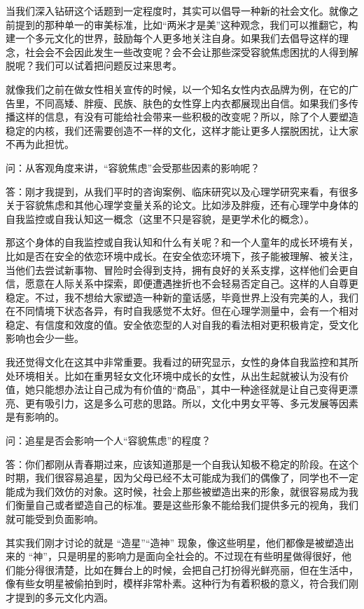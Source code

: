 当我们深入钻研这个话题到一定程度时，其实可以倡导一种新的社会文化。就像之前提到的那种单一的审美标准，比如``两米才是美''这种观念，我们可以推翻它，构建一个多元文化的世界，鼓励每个人更多地关注自身。如果我们去倡导这样的理念，社会会不会因此发生一些改变呢？会不会让那些深受容貌焦虑困扰的人得到解脱呢？我们可以试着把问题反过来思考。

就像我们之前在做女性相关宣传的时候，以一个知名女性内衣品牌为例，在它的广告里，不同高矮、胖瘦、民族、肤色的女性穿上内衣都展现出自信。如果我们多传播这样的信息，有没有可能给社会带来一些积极的改变呢？所以，除了个人要塑造稳定的内核，我们还需要创造不一样的文化，这样才能让更多人摆脱困扰，让大家不再为此担忧。


问：从客观角度来讲，``容貌焦虑''会受那些因素的影响呢？

答：刚才我提到，从我们平时的咨询案例、临床研究以及心理学研究来看，有很多关于容貌焦虑和其他心理学变量关系的论文。比如涉及胖瘦，还有心理学中身体的自我监控或自我认知这一概念（这里不只是容貌，是更学术化的概念）。

那这个身体的自我监控或自我认知和什么有关呢？和一个人童年的成长环境有关，比如是否在安全的依恋环境中成长。在安全依恋环境下，孩子能被理解、被关注，当他们去尝试新事物、冒险时会得到支持，拥有良好的关系支撑，这样他们会更自信，愿意在人际关系中探索，即便遭遇挫折也不会轻易否定自己。这样的人自尊更稳定。不过，我不想给大家塑造一种新的童话感，毕竟世界上没有完美的人，我们在不同情境下状态各异，有时自我感觉不太好。但在心理学测量中，会有一个相对稳定、有信度和效度的值。安全依恋型的人对自我的看法相对更积极肯定，受文化影响也会少一些。

我还觉得文化在这其中非常重要。我看过的研究显示，女性的身体自我监控和其所处环境相关。比如在重男轻女文化环境中成长的女性，从出生起就被认为没有价值，她只能想办法让自己成为有价值的``商品''，其中一种途径就是让自己变得更漂亮、更有吸引力，这是多么可悲的思路。所以，文化中男女平等、多元发展等因素是有影响的。


问：追星是否会影响一个人``容貌焦虑''的程度？

答：你们都刚从青春期过来，应该知道那是一个自我认知极不稳定的阶段。在这个时期，我们很容易追星，因为父母已经不太可能成为我们的偶像了，同学也不一定能成为我们效仿的对象。这时候，社会上那些被塑造出来的形象，就很容易成为我们衡量自己或者塑造自己的标准。要是这些形象不能给我们提供多元的视角，我们就可能受到负面影响。

其实我们刚才讨论的就是 ``造星''``造神'' 现象，像这些明星，他们都像是被塑造出来的 ``神''，只是明星的影响力是面向全社会的。不过现在有些明星做得很好，他们能分得很清楚，比如在舞台上的时候，会把自己打扮得光鲜亮丽，但在生活中，像有些女明星被偷拍到时，模样非常朴素。这种行为有着积极的意义，符合我们刚才提到的多元文化内涵。


